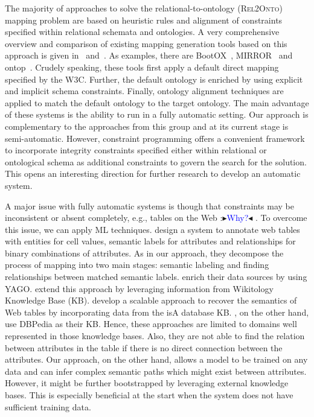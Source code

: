 \documentclass[letterpaper]{article} %
\newcommand{\authornote}[3]{
  {\fbox{\sc 
  #1}:$\blacktriangleright$\textcolor{#2}{\small{#3}}$\blacktriangleleft$}%
}
\newcommand{\ddg}[1]{\authornote{DDG}{blue}{#1}}
\newcommand{\relonto}{\textsc{Rel2Onto}}
\begin{document}
The majority of approaches to solve the relational-to-ontology (\relonto{}) mapping problem are based on heuristic rules and alignment of constraints specified within relational schemata and ontologies.
A very comprehensive overview and comparison of existing mapping generation tools based on this approach is given in~\cite{Pinkel:rodi} and~\cite{Spanos:semweb}.
As examples, there are BootOX~\cite{Jimenez:Bootox}, MIRROR~\cite{Luciano:Mirror} and  ontop~\cite{Fagin:Clio}.
Crudely speaking, these tools first apply a default direct mapping specified by the W3C.
Further, the default ontology is enriched by using explicit and implicit schema constraints.
Finally, ontology alignment techniques are applied to match the default ontology to the target ontology.
The main advantage of these systems is the ability to run in a fully automatic setting.
Our approach is complementary to the approaches from this group and at its current stage is semi-automatic.
However, constraint programming offers a convenient framework to incorporate integrity constraints specified either within relational or ontological schema as additional constraints to govern the search for the solution.
This opens an interesting direction for further research to develop an automatic system.

A major issue with fully automatic systems is though that constraints may be inconsistent or absent completely, e.g., tables on the Web \ddg{Why?}.
To overcome this issue, we can apply ML techniques.
\cite{Limaye:Annotating} design a system to annotate web tables with entities for cell values, semantic labels for attributes and relationships for binary combinations of attributes.
As in our approach, they decompose the process of mapping into two main stages: semantic labeling and finding relationships between matched semantic labels.
\cite{Limaye:Annotating} enrich their data sources by using YAGO.
\cite{Mulwad:Semantic} extend this approach by leveraging information from Wikitology Knowledge Base (KB).
\cite{Venetis:Recovering} develop a scalable approach to recover the semantics of Web tables by incorporating data from the isA database KB.
\cite{Ritze:matching}, on the other hand, use DBPedia as their KB.
Hence, these approaches are limited to domains well represented in those knowledge bases.
Also, they are not able to find the relation between attributes in the table if there is no direct connection between the attributes.
Our approach, on the other hand, allows a model to be trained on any data and can infer complex semantic paths which might exist between attributes.
However, it might be further bootstrapped by leveraging external knowledge bases.
This is especially beneficial at the start when the system does not have sufficient training data.
\end{document}
